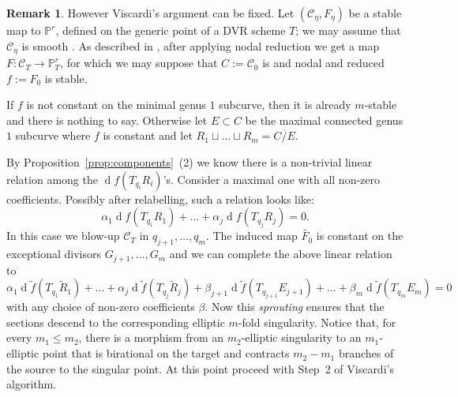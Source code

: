\documentclass[11pt]{amsart}
\newcommand{\PP}{\mathbb P}
\renewcommand{\to}{\rightarrow}
\newcommand{\cC}{\mathcal C}
\theoremstyle{plain}
\theoremstyle{definition}
\newtheorem{remark}[thm]{Remark}
\begin{document}
\begin{remark}
However Viscardi's argument can be fixed. Let $(\mathcal{C}_\eta,F_{\eta})$ be a stable map to $\PP^r$, defined on the generic point of a DVR scheme $T$; we may assume that $\mathcal C_{\eta}$ is smooth \cite[Section~3.2.1]{VISC}. 
As described in \cite[Theorem~3.6, Step~1]{VISC}, after applying nodal reduction we get a map $F\colon\mathcal C_T\to\PP^r_{T}$, for which we may suppose that $C:=\cC_0$ is and nodal and reduced $f:=F_0$ is stable.

If $f$ is not constant on the minimal genus $1$ subcurve, then it is already $m$-stable and there is nothing to say. Otherwise let $E\subset C$ be the maximal connected genus $1$ subcurve where $f$ is constant and let $R_1\sqcup\ldots\sqcup R_m=\overline{C/E}$.

 By Proposition~\ref{prop:components}~(2) we know there is a non-trivial linear relation among the $\operatorname{d}\!f(T_{q_i}R_i)$'s.
 Consider a maximal one with all non-zero coefficients.  Possibly after relabelling, such a relation looks like:
 \begin{equation*}\label{eq:linrelation}
 \alpha_1\operatorname{d}\!f(T_{q_{1}}R_{1})+\ldots +\alpha_j \operatorname{d}\!f(T_{q_{j}}R_{j})=0.
 \end{equation*}
 In this case we blow-up $\mathcal{C}_T$ in $q_{j+1},\ldots, q_m$. The induced map $\tilde{F_0}$ is constant on the exceptional divisors $G_{j+1},\ldots, G_m$ and we can complete the above linear relation to 
 \[\alpha_1\operatorname{d}\!\tilde f(T_{q_{1}}\tilde R_{1})+\ldots +\alpha_j \operatorname{d}\!\tilde f(T_{q_{j}}\tilde R_{j})+\beta_{j+1}\operatorname{d}\!\tilde f(T_{q_{j+1}}E_{j+1})+\ldots+\beta_m\operatorname{d}\!\tilde f(T_{q_{m}}E_m)=0\]
  with any choice of non-zero coefficients $\beta$. Now this \emph{sprouting} \cite[Section 2.3]{SMY2} ensures that the sections descend to the corresponding elliptic $m$-fold singularity. Notice that, for every $m_1\leq m_2$, there is a morphism from an $m_2$-elliptic singularity to an $m_1$-elliptic point that is birational on the target and contracts $m_2-m_1$ branches of the source to the singular point. At this point proceed with Step~2 of Viscardi's algorithm.
  

\end{remark}
\end{document}
